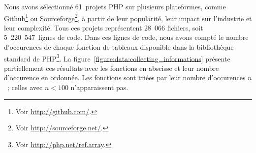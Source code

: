 Nous avons sélectionné 61~projets PHP sur plusieurs plateformes, comme
Github\footnote{Voir \url{http://github.com/}.} ou Sourceforge\footnote{Voir
\url{http://sourceforge.net/}.}, à partir de leur popularité, leur impact sur
l'industrie et leur complexité. Tous ces projets représentent 28~066 fichiers,
soit 5~220~547~lignes de code. Dans ces lignes de code, nous avons compté le
nombre d'occurences de chaque fonction de tableaux disponible dans la
bibliothèque standard de PHP\footnote{Voir \url{http://php.net/ref.array}.}. La
figure~\ref{figure:data:collecting_informations} présente partiellement ces
résultats avec les fonctions en abscisse et leur nombre d'occurence en ordonnée.
Les fonctions sont triées par leur nombre d'occurences $n$~; celles avec $n <
100$ n'apparaissent pas.
%
\begin{figure}

{
\Huge

}
\end{figure}
